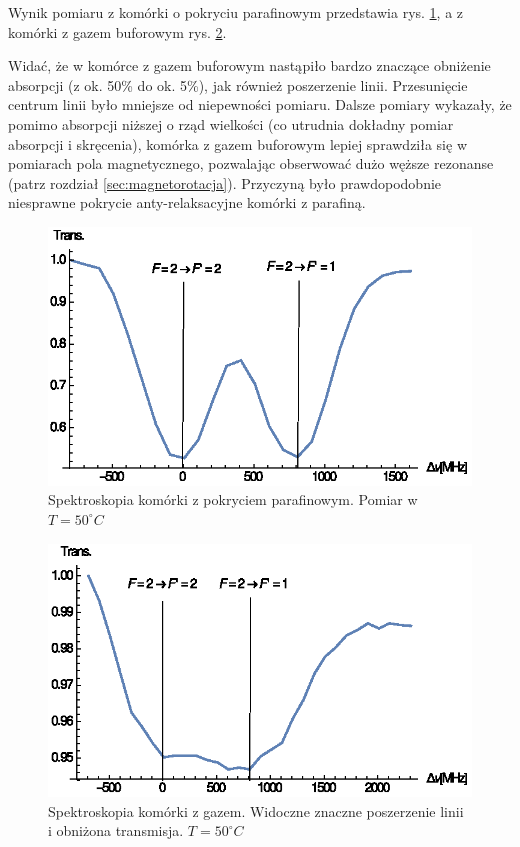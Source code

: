\documentclass[a4paper,10pt]{article}
\begin{document}
Wynik pomiaru z komórki o pokryciu parafinowym przedstawia rys. \ref{fig:spekpara}, a z komórki z gazem buforowym rys. \ref{fig:spekgaz}.

Widać, że w komórce z gazem buforowym nastąpiło bardzo znaczące obniżenie absorpcji (z ok. 50\% do ok. 5\%), jak również poszerzenie linii. Przesunięcie centrum linii było mniejsze od niepewności pomiaru. Dalsze pomiary wykazały, że pomimo absorpcji niższej o rząd wielkości (co utrudnia dokładny pomiar absorpcji i skręcenia), komórka z gazem buforowym lepiej sprawdziła się w pomiarach pola magnetycznego, pozwalając obserwować dużo węższe rezonanse (patrz rozdział \ref{sec:magnetorotacja}). Przyczyną było prawdopodobnie niesprawne pokrycie anty-relaksacyjne komórki z parafiną.


\begin{figure}[h!]
\centering
 \includegraphics[width=\textwidth]{spek_para.eps}
 \caption{Spektroskopia komórki z pokryciem parafinowym. Pomiar w $T=50^{\circ}C$}
 \label{fig:spekpara}
\end{figure}



\begin{figure}[h!]
\centering
 \includegraphics[width=\textwidth]{spek_gaz.eps}
 \caption{Spektroskopia komórki z gazem. Widoczne znaczne poszerzenie linii i obniżona transmisja. $T=50^{\circ}C$}
 \label{fig:spekgaz}
\end{figure}
\end{document}
